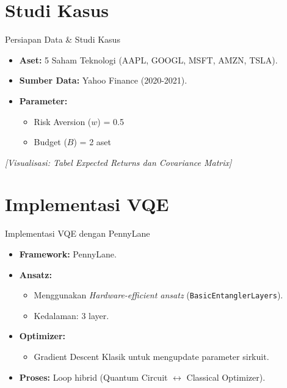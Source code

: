 \documentclass{beamer}
\begin{document}
\section{Studi Kasus}
\begin{frame}{Persiapan Data \& Studi Kasus}
    \begin{itemize}
        	\item \textbf{Aset:} 5 Saham Teknologi (AAPL, GOOGL, MSFT, AMZN, TSLA).
        \item \textbf{Sumber Data:} Yahoo Finance (2020-2021).
        \item \textbf{Parameter:}
        \begin{itemize}
            	\item Risk Aversion ($w$) = 0.5
            	\item Budget ($B$) = 2 aset
        \end{itemize}
    \end{itemize}

    \vspace{0.5cm}
    \begin{center}
        \textit{[Visualisasi: Tabel Expected Returns dan Covariance Matrix]}
    \end{center}
\end{frame}

\section{Implementasi VQE}
\begin{frame}{Implementasi VQE dengan PennyLane}
    \begin{itemize}
        	\item \textbf{Framework:} PennyLane.
        \item \textbf{Ansatz:} 
        \begin{itemize}
            	\item Menggunakan \textit{Hardware-efficient ansatz} (\texttt{BasicEntanglerLayers}).
            	\item Kedalaman: 3 layer.
        \end{itemize}
        \item \textbf{Optimizer:} 
        \begin{itemize}
            	\item Gradient Descent Klasik untuk mengupdate parameter sirkuit.
        \end{itemize}
        \item \textbf{Proses:} Loop hibrid (Quantum Circuit $\leftrightarrow$ Classical Optimizer).
    \end{itemize}
\end{frame}
\end{document}
